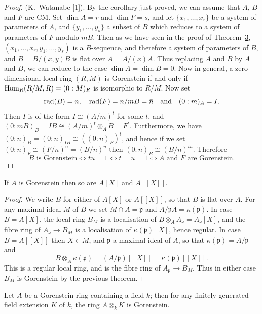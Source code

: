 \begin{proof}
(K.~Watanabe [1]). By the corollary just proved, we can assume that $A$, $B$ and
$F$ are CM. Set $\dim A = r$ and $\dim F = s$, and let $\{x_1, \ldots, x_r\}$ be a
system of parameters of $A$, and $\{y_1, \ldots, y_s\}$ a subset of $B$ which reduces
to a system of parameters of $F$ modulo $mB$. Then as we have seen in the proof
of Theorem~\hyperref[thm:23.3]{3}, $(x_1, \ldots, x_r, y_1, \ldots, y_s)$ is a $B$-sequence, and
therefore a system of parameters of $B$, and $\bar{B} = B/(x, y)B$ is flat over
$\bar{A} = A/(x)A$. Thus replacing $A$ and $B$ by $\bar{A}$ and $\bar{B}$, we can reduce to
the case $\dim A = \dim B = 0$. Now in general, a zero-dimensional local ring
$(R, M)$ is Gorenstein if and only if $\operatorname{Hom}_R(R/M, R) = (0 : M)_R$ is isomorphic to
$R/M$. Now set
\[
  \operatorname{rad}(B) = n, \quad \operatorname{rad}(F) = n/mB = \bar{n} \quad \text{and} \quad (0 : m)_A = I.
\]
Then $I$ is of the form $I \cong (A/m)^t$ for some $t$, and
$(0 : mB)_B = IB \cong (A/m)^t \otimes_A B = F^t$. Furthermore, we have
$(0 : n)_B = (0 : \bar{n})_{IB} \cong ((0 : \bar{n})_F)^t$, and hence if we set
$(0 : \bar{n})_F \cong (F/\bar{n})^u = (B/n)^u$ then $(0 : n)_B \cong (B/n)^{tu}$.
Therefore
\[
  B \text{ is Gorenstein} \iff tu = 1 \iff t = u = 1 \iff A \text{ and } F \text{ are Gorenstein}.
\]
\end{proof}

\begin{theorem}\label{thm:23.5}
If $A$ is Gorenstein then so are $A[X]$ and $A[[X]]$.
\end{theorem}

\begin{proof}
We write $B$ for either of $A[X]$ or $A[[X]]$, so that $B$ is flat over $A$. For any
maximal ideal $M$ of $B$ we set $M \cap A = \mathfrak{p}$ and $A/\mathfrak{p}A = \kappa(\mathfrak{p})$. In case
$B = A[X]$, the local ring $B_M$ is a localisation of $B \otimes_A A_{\mathfrak{p}} =
A_{\mathfrak{p}}[X]$, and the fibre ring of $A_{\mathfrak{p}} \to B_M$ is a localisation of
$\kappa(\mathfrak{p})[X]$, hence regular. In case $B = A[[X]]$ then $X \in M$, and
$\mathfrak{p}$ a maximal ideal of $A$, so that $\kappa(\mathfrak{p}) = A/\mathfrak{p}$ and
\[
  B \otimes_A \kappa(\mathfrak{p}) = (A/\mathfrak{p})[[X]] = \kappa(\mathfrak{p})[[X]].
\]
This is a regular local ring, and is the fibre ring of $A_{\mathfrak{p}} \to B_M$. Thus in
either case $B_M$ is Gorenstein by the previous theorem.
\end{proof}

\begin{theorem}\label{thm:23.6}
Let $A$ be a Gorenstein ring containing a field $k$; then for any finitely
generated field extension $K$ of $k$, the ring $A \otimes_k K$ is Gorenstein.
\end{theorem}

